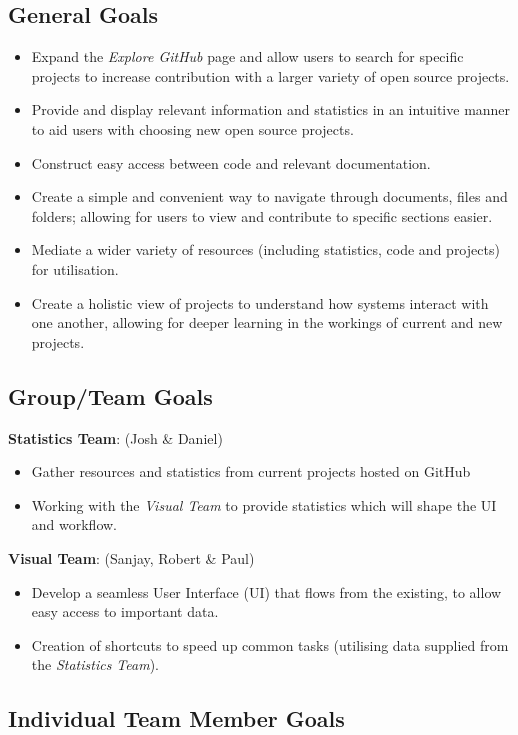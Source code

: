 \documentclass[12pt]{article}
\begin{document}
\subsection{General Goals}
\begin{itemize}
\item Expand the \emph{Explore GitHub} page and allow users to search for specific projects to increase contribution with a larger variety of open source projects.
\item Provide and display relevant information and statistics in an intuitive manner to aid users with choosing new open source projects.
\item Construct easy access between code and relevant documentation.
\item Create a simple and convenient way to navigate through documents, files and folders; allowing for users to view and contribute to specific sections easier.
\item Mediate a wider variety of resources (including statistics, code and projects) for utilisation.
\item Create a holistic view of projects to understand how systems interact with one another, allowing for deeper learning in the workings of current and new projects.
\end{itemize}
\subsection{Group/Team Goals}
\textbf{Statistics Team}: (Josh \& Daniel)
\begin{itemize}
\item Gather resources and statistics from current projects hosted on GitHub
\item Working with the \emph{Visual Team} to provide statistics which will shape the UI and workflow.
\end{itemize}
\textbf{Visual Team}: (Sanjay, Robert \& Paul)
\begin{itemize}
\item Develop a seamless User Interface (UI) that flows from the existing, to allow easy access to important data.
\item Creation of shortcuts to speed up common tasks (utilising data supplied from the \emph{Statistics Team}).
\end{itemize}
\subsection{Individual Team Member Goals}
\end{document}
